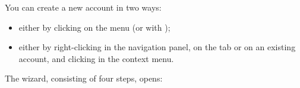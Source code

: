 You can create a new account in two ways:
\begin{itemize}
	\item either by clicking on the menu  (or with );
	\item either by right-clicking in the navigation panel, on the  tab or on an existing account, and clicking  in the context menu.
\end{itemize}
The  wizard, consisting of four steps, opens:
